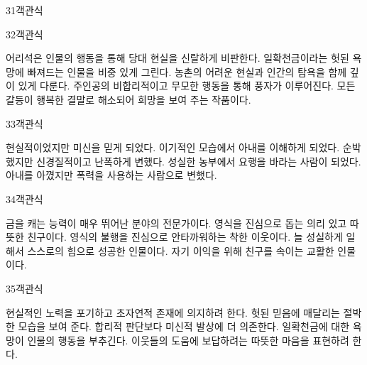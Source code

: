 \documentclass[fs9,seriesRus]{korfarm-base}
\begin{document}
\begin{kfQBlock}{31}{객관식}
\end{kfQBlock}
\begin{kfQBlock}{32}{객관식}
\begin{kfChoices}
\kfChoice 어리석은 인물의 행동을 통해 당대 현실을 신랄하게 비판한다.
\kfChoice 일확천금이라는 헛된 욕망에 빠져드는 인물을 비중 있게 그린다.
\kfChoice 농촌의 어려운 현실과 인간의 탐욕을 함께 깊이 있게 다룬다.
\kfChoice 주인공의 비합리적이고 무모한 행동을 통해 풍자가 이루어진다.
\kfChoice 모든 갈등이 행복한 결말로 해소되어 희망을 보여 주는 작품이다.
\end{kfChoices}
\end{kfQBlock}
\begin{kfQBlock}{33}{객관식}
\begin{kfChoices}
\kfChoice 현실적이었지만 미신을 믿게 되었다.
\kfChoice 이기적인 모습에서 아내를 이해하게 되었다.
\kfChoice 순박했지만 신경질적이고 난폭하게 변했다.
\kfChoice 성실한 농부에서 요행을 바라는 사람이 되었다.
\kfChoice 아내를 아꼈지만 폭력을 사용하는 사람으로 변했다.
\end{kfChoices}
\end{kfQBlock}
\begin{kfQBlock}{34}{객관식}
\begin{kfChoices}
\kfChoice 금을 캐는 능력이 매우 뛰어난 분야의 전문가이다.
\kfChoice 영식을 진심으로 돕는 의리 있고 따뜻한 친구이다.
\kfChoice 영식의 불행을 진심으로 안타까워하는 착한 이웃이다.
\kfChoice 늘 성실하게 일해서 스스로의 힘으로 성공한 인물이다.
\kfChoice 자기 이익을 위해 친구를 속이는 교활한 인물이다.
\end{kfChoices}
\end{kfQBlock}
\begin{kfQBlock}{35}{객관식}
\begin{kfChoices}
\kfChoice 현실적인 노력을 포기하고 초자연적 존재에 의지하려 한다.
\kfChoice 헛된 믿음에 매달리는 절박한 모습을 보여 준다.
\kfChoice 합리적 판단보다 미신적 발상에 더 의존한다.
\kfChoice 일확천금에 대한 욕망이 인물의 행동을 부추긴다.
\kfChoice 이웃들의 도움에 보답하려는 따뜻한 마음을 표현하려 한다.
\end{kfChoices}
\end{kfQBlock}
\end{document}
